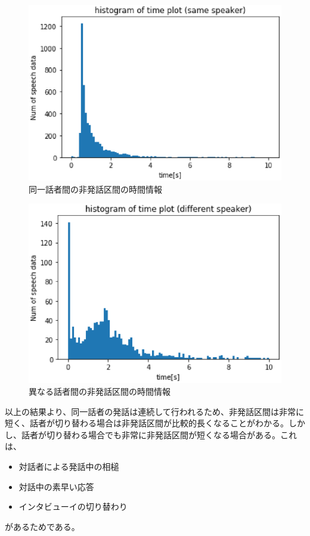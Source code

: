 \begin{figure}[H]
  \begin{center}
    \includegraphics{./figure/same_sp.eps}
  \end{center}
  \caption{同一話者間の非発話区間の時間情報 \label{fig:same_sp}}
\end{figure}

\begin{figure}[H]
  \begin{center}
    \includegraphics{./figure/different_sp.eps}
  \end{center}
  \caption{異なる話者間の非発話区間の時間情報 \label{fig:different_sp}}
\end{figure}

以上の結果より、同一話者の発話は連続して行われるため、非発話区間は非常に短く、話者が切り替わる場合は非発話区間が比較的長くなることがわかる。しかし、話者が切り替わる場合でも非常に非発話区間が短くなる場合がある。これは、

\begin{itemize}
\item 対話者による発話中の相槌
\item 対話中の素早い応答
\item インタビューイの切り替わり
\end{itemize}

があるためである。